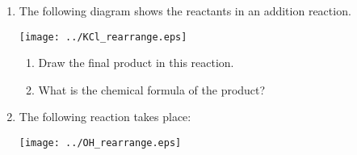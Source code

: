{\begin{enumerate}
\item{The following diagram shows the reactants in an addition reaction.}

%

\begin{center}
\texttt{[image: ../KCl\_rearrange.eps]}
\end{center}



\begin{enumerate}
\item{Draw the final product in this reaction.}
\item{What is the chemical formula of the product?}
\end{enumerate}

\item{The following reaction takes place:}

%

\begin{center}
\texttt{[image: ../OH\_rearrange.eps]}
\end{center}



\end{enumerate}}
